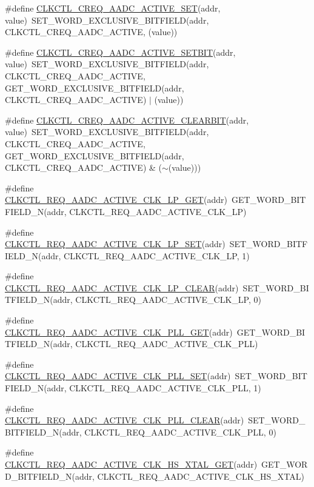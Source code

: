 \begin{DoxyCompactItemize}
\item 
\#define \hyperlink{a00544_a63741274246137675c083bb391e8bb05}{CLKCTL\_\-CREQ\_\-AADC\_\-ACTIVE\_\-SET}(addr, value)~SET\_\-WORD\_\-EXCLUSIVE\_\-BITFIELD(addr, CLKCTL\_\-CREQ\_\-AADC\_\-ACTIVE, (value))
\item 
\#define \hyperlink{a00544_a921daf668c6c3f3eb1a016dea2435911}{CLKCTL\_\-CREQ\_\-AADC\_\-ACTIVE\_\-SETBIT}(addr, value)~SET\_\-WORD\_\-EXCLUSIVE\_\-BITFIELD(addr, CLKCTL\_\-CREQ\_\-AADC\_\-ACTIVE, GET\_\-WORD\_\-EXCLUSIVE\_\-BITFIELD(addr, CLKCTL\_\-CREQ\_\-AADC\_\-ACTIVE) $|$ (value))
\item 
\#define \hyperlink{a00544_a532ffb561321083a23a59b8956bdaf06}{CLKCTL\_\-CREQ\_\-AADC\_\-ACTIVE\_\-CLEARBIT}(addr, value)~SET\_\-WORD\_\-EXCLUSIVE\_\-BITFIELD(addr, CLKCTL\_\-CREQ\_\-AADC\_\-ACTIVE, GET\_\-WORD\_\-EXCLUSIVE\_\-BITFIELD(addr, CLKCTL\_\-CREQ\_\-AADC\_\-ACTIVE) \& ($\sim$(value)))
\item 
\#define \hyperlink{a00544_aba39079bd6133aa14e7c0a63483a5a8e}{CLKCTL\_\-REQ\_\-AADC\_\-ACTIVE\_\-CLK\_\-LP\_\-GET}(addr)~GET\_\-WORD\_\-BITFIELD\_\-N(addr, CLKCTL\_\-REQ\_\-AADC\_\-ACTIVE\_\-CLK\_\-LP)
\item 
\#define \hyperlink{a00544_a9baad66385b80682b3feaa24b0ea5c02}{CLKCTL\_\-REQ\_\-AADC\_\-ACTIVE\_\-CLK\_\-LP\_\-SET}(addr)~SET\_\-WORD\_\-BITFIELD\_\-N(addr, CLKCTL\_\-REQ\_\-AADC\_\-ACTIVE\_\-CLK\_\-LP, 1)
\item 
\#define \hyperlink{a00544_a1449caafaec8454425a74b9e11d9cee2}{CLKCTL\_\-REQ\_\-AADC\_\-ACTIVE\_\-CLK\_\-LP\_\-CLEAR}(addr)~SET\_\-WORD\_\-BITFIELD\_\-N(addr, CLKCTL\_\-REQ\_\-AADC\_\-ACTIVE\_\-CLK\_\-LP, 0)
\item 
\#define \hyperlink{a00544_ac5e3d73405ce771657610419d1d18a1d}{CLKCTL\_\-REQ\_\-AADC\_\-ACTIVE\_\-CLK\_\-PLL\_\-GET}(addr)~GET\_\-WORD\_\-BITFIELD\_\-N(addr, CLKCTL\_\-REQ\_\-AADC\_\-ACTIVE\_\-CLK\_\-PLL)
\item 
\#define \hyperlink{a00544_af80c182b9e268ee9f67752a3b56f7054}{CLKCTL\_\-REQ\_\-AADC\_\-ACTIVE\_\-CLK\_\-PLL\_\-SET}(addr)~SET\_\-WORD\_\-BITFIELD\_\-N(addr, CLKCTL\_\-REQ\_\-AADC\_\-ACTIVE\_\-CLK\_\-PLL, 1)
\item 
\#define \hyperlink{a00544_a06a1d801e9cd253212aafbb3e2c58d92}{CLKCTL\_\-REQ\_\-AADC\_\-ACTIVE\_\-CLK\_\-PLL\_\-CLEAR}(addr)~SET\_\-WORD\_\-BITFIELD\_\-N(addr, CLKCTL\_\-REQ\_\-AADC\_\-ACTIVE\_\-CLK\_\-PLL, 0)
\item 
\#define \hyperlink{a00544_ab6b8a164ef0d81c4f07b936633cedada}{CLKCTL\_\-REQ\_\-AADC\_\-ACTIVE\_\-CLK\_\-HS\_\-XTAL\_\-GET}(addr)~GET\_\-WORD\_\-BITFIELD\_\-N(addr, CLKCTL\_\-REQ\_\-AADC\_\-ACTIVE\_\-CLK\_\-HS\_\-XTAL)

\end{DoxyCompactItemize}
